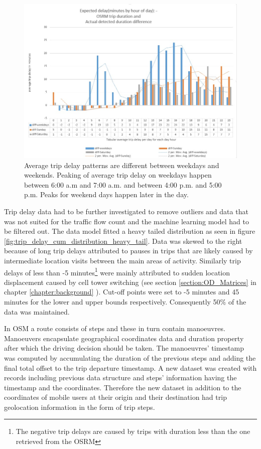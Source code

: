 \documentclass[12pt, a4paper]{report}
\theoremstyle{definition}
\theoremstyle{definition}%
\theoremstyle{definition}%
\theoremstyle{definition}%
\theoremstyle{definition}%
\theoremstyle{definition}%
\begin{document}
\begin{figure}[h]	
	\includegraphics[scale=0.60]{Trip_delay.jpg}
	\centering
	\caption[Hourly average trip delay weekdays vs weekends]{Average trip delay patterns are different between weekdays and weekends. Peaking of average trip delay on weekdays happen between 6:00 a.m and 7:00 a.m. and between 4:00 p.m. and 5:00 p.m. Peaks for weekend days happen later in the day.}
	\label{fig:trip_delay_weekdays_vs_weekends}
\end{figure}

Trip delay data had to be further investigated to remove outliers and data that was not suited for the traffic flow count and the machine learning model had to be filtered out. The data model fitted a heavy tailed distribution as seen in figure \ref{fig:trip_delay_cum_distribution_heavy_tail}. Data was skewed to the right because of long trip delays attributed to pauses in trips that are likely caused by intermediate location visits between the main areas of activity. Similarly trip delays of less than -5 minutes\footnote{The negative trip delays are caused by trips with duration less than the one retrieved from the OSRM} were mainly attributed to sudden location displacement caused by cell tower switching (see section \ref{section:OD_Matrices} in chapter \ref{chapter:background} ). Cut-off points were set to -5 minutes and 45 minutes for the lower and upper bounds respectively. Consequently 50\% of the data was maintained.  

In OSM a route consists of steps and these in turn contain manoeuvres. Manoeuvers encapsulate geographical coordinates data and duration property after which the driving decision should be taken. The manoeuvres' timestamp was computed by accumulating the duration of the previous steps and adding the final total offset to the trip departure timestamp. A new dataset was created with records including previous data structure and steps' information having the timestamp and the coordinates. Therefore the new dataset in addition to the coordinates of mobile users at their origin and their destination had trip geolocation information in the form of trip steps.
 
\end{document}
